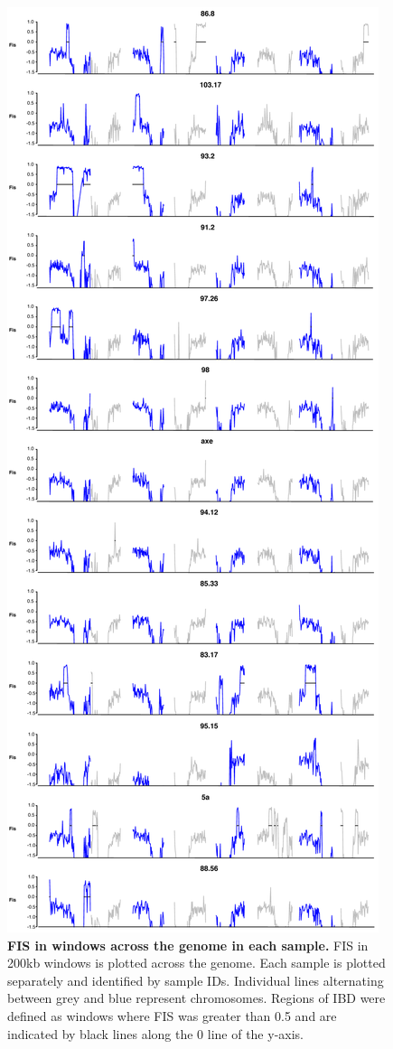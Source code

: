 \begin{figure}[ht!]
      \centering
       \includegraphics[scale=0.1]{Ch2FigS5}
    \caption{\textbf{FIS in windows across the genome in each sample.} FIS in 200kb windows is plotted across the genome. Each sample is plotted separately and identified by sample IDs. Individual lines alternating between grey and blue represent chromosomes. Regions of IBD were defined as windows where FIS was greater than 0.5 and are indicated by black lines along the 0 line of the y-axis.}
    \label{fig:figS5}
\end{figure}

